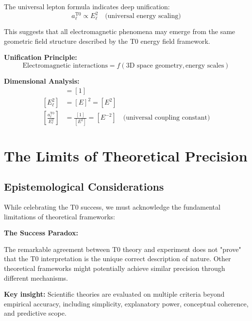\documentclass[12pt,a4paper]{report}
\begin{document}
The universal lepton formula indicates deep unification:
\begin{equation}
	a_\ell^{\text{T0}} \propto E_\ell^2 \quad \text{(universal energy scaling)}
\end{equation}

This suggests that all electromagnetic phenomena may emerge from the same geometric field structure described by the T0 energy field framework.

\textbf{Unification Principle:}
\begin{equation}
	\text{Electromagnetic interactions} = f(\text{3D space geometry}, \text{energy scales})
\end{equation}

\textbf{Dimensional Analysis:}
\begin{align}
	[a_\ell^{\text{T0}}] &= [1] \\
	[E_\ell^2] &= [E]^2 = [E^2] \\
	\left[\frac{a_\ell^{\text{T0}}}{E_\ell^2}\right] &= \frac{[1]}{[E^2]} = [E^{-2}] \quad \text{(universal coupling constant)}
\end{align}

\section{The Limits of Theoretical Precision}
\label{sec:limits_precision}

\subsection{Epistemological Considerations}
\label{subsec:epistemological_considerations}

While celebrating the T0 success, we must acknowledge the fundamental limitations of theoretical frameworks:

\begin{tcolorbox}[colback=yellow!5!white,colframe=orange!75!black,title=Theoretical Humility]
	\textbf{The Success Paradox:}
	
	The remarkable agreement between T0 theory and experiment does not "prove" that the T0 interpretation is the unique correct description of nature. Other theoretical frameworks might potentially achieve similar precision through different mechanisms.
	
	\textbf{Key insight:} Scientific theories are evaluated on multiple criteria beyond empirical accuracy, including simplicity, explanatory power, conceptual coherence, and predictive scope.
\end{tcolorbox}
\end{document}
